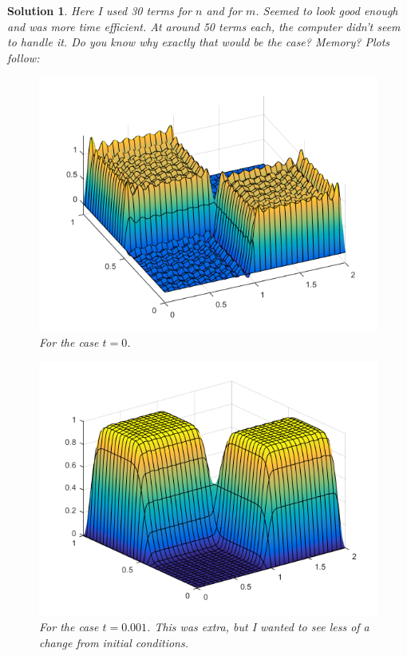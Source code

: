 \documentclass[leqno]{article}
\theoremstyle{nonumberplain}
\newtheorem{solution}{Solution}
\begin{document}
\begin{solution}
Here I used 30 terms for $n$ and for $m$.  Seemed to look good enough and was more time efficient. At around 50 terms each, the computer didn't seem to handle it.  Do you know why exactly that would be the case?  Memory? Plots follow:
\begin{figure}[h]
    \centering
    \includegraphics{problem_2_hw_5.png}
    \caption{For the case $t=0$.}
    \label{fig:my_label}
\end{figure}

\pagebreak

\begin{figure}[h]
    \centering
    \includegraphics{problem_2_t=001_hw_5.png}
    \caption{For the case $t=0.001$. This was extra, but I wanted to see less of a change from initial conditions.}
    \label{fig:my_label}
\end{figure}


\end{solution}
\end{document}
